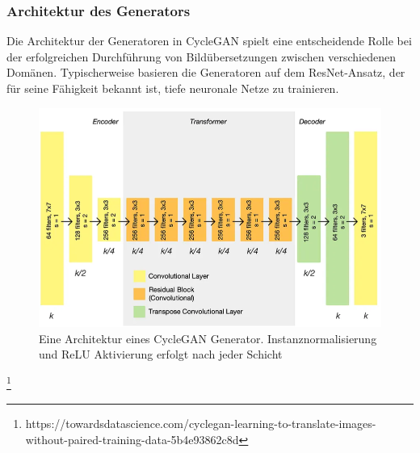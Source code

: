 \subsubsection{Architektur des Generators}
Die Architektur der Generatoren in CycleGAN spielt eine entscheidende Rolle bei der erfolgreichen Durchführung von Bildübersetzungen zwischen verschiedenen Domänen. Typischerweise basieren die Generatoren auf dem ResNet-Ansatz, der für seine Fähigkeit bekannt ist, tiefe neuronale Netze zu trainieren\cite{He.2015}.
\\

\begin{figure}[ht]
	\centering
	\includegraphics[width=0.8\linewidth]{./images/cycleGanGeneratorArchitecture.png}
	\caption{Eine Architektur eines CycleGAN Generator. Instanznormalisierung und ReLU Aktivierung erfolgt nach jeder Schicht
	\protect\footnotemark}
	\label{fig:cycleGanGeneratorArchitecture}
\end{figure}
\footnote[1]{https://towardsdatascience.com/cyclegan-learning-to-translate-images-without-paired-training-data-5b4e93862c8d}

